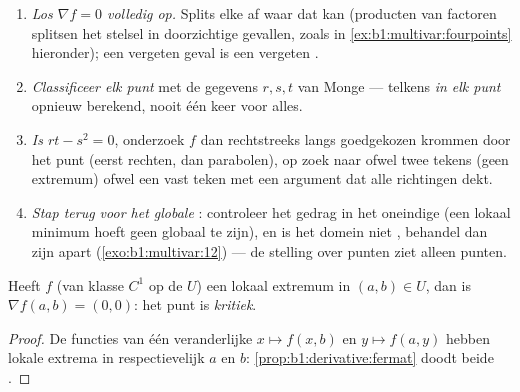\begin{method}
\label{met:b1:multivar:extremamethod}
\begin{enumerate}
  \item \emph{Los $\nabla f = 0$ volledig op.} Splits elke
         af waar dat kan (producten van 
        factoren splitsen het stelsel in doorzichtige gevallen,
        zoals in \cref{ex:b1:multivar:fourpoints} hieronder); een
        vergeten geval is een vergeten .
  \item \emph{Classificeer elk punt} met de gegevens $r, s, t$ van
        Monge --- telkens \emph{in elk punt} opnieuw berekend,
        nooit één keer voor alles.
  \item \emph{Is $rt - s^2 = 0$}, onderzoek $f$ dan rechtstreeks
        langs goedgekozen krommen door het punt (eerst rechten, dan
        parabolen), op zoek naar ofwel twee tekens (geen extremum)
        ofwel een vast teken met een argument dat alle richtingen
        dekt.
  \item \emph{Stap terug voor het globale }: controleer het
        gedrag in het oneindige (een lokaal minimum hoeft geen
        globaal te zijn), en is het domein niet , behandel dan
        zijn  apart (\cref{exo:b1:multivar:12}) --- de stelling
        over  punten ziet alleen  punten.
\end{enumerate}
\end{method}

\begin{theorem}\label{thm:b1:multivar:critical}
Heeft $f$ (van klasse $C^1$ op de  $U$) een lokaal
extremum in $(a,b) \in U$, dan is $\nabla f(a,b) = (0,0)$: het punt
is \emph{kritiek}.
\end{theorem}

\begin{proof}
De functies van één veranderlijke $x \mapsto f(x, b)$ en $y \mapsto
f(a, y)$ hebben  lokale extrema in respectievelijk $a$ en
$b$: \cref{prop:b1:derivative:fermat} doodt beide .
\end{proof}

